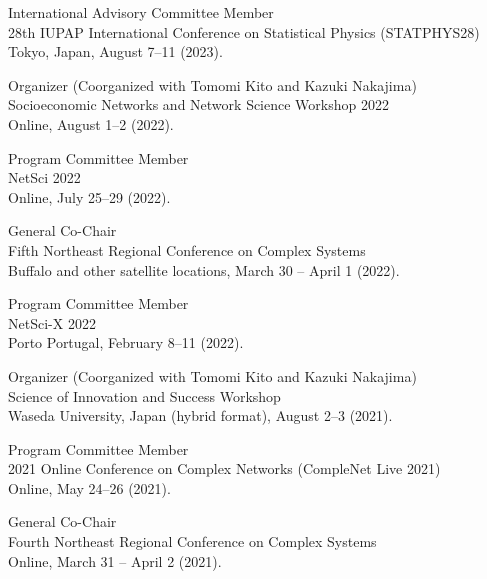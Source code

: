 \documentclass[11pt,letter]{article}
\renewenvironment{itemize}{
  \begin{list}{}{
    \setlength{\leftmargin}{1.5em}
    \setlength{\itemsep}{0.25em}
    \setlength{\parskip}{0pt}
    \setlength{\parsep}{0.25em}
  }
}{
  \end{list}
}
\begin{document}
\begin{itemize}
\item International Advisory Committee Member\\
28th IUPAP International Conference on Statistical Physics (STATPHYS28)\\
Tokyo, Japan, August 7--11 (2023).

\item Organizer (Coorganized with Tomomi Kito and Kazuki Nakajima)\\
Socioeconomic Networks and Network Science Workshop 2022\\
Online, August 1--2 (2022).

\item Program Committee Member\\
NetSci 2022\\
Online, July 25--29 (2022).

\item General Co-Chair\\
Fifth Northeast Regional Conference on Complex Systems\\
Buffalo and other satellite locations, March 30 -- April 1 (2022).

\item Program Committee Member\\
NetSci-X 2022\\
Porto Portugal, February 8--11 (2022).

\item Organizer (Coorganized with Tomomi Kito and Kazuki Nakajima)\\
Science of Innovation and Success Workshop\\
Waseda University, Japan (hybrid format), August 2--3 (2021).


\item Program Committee Member\\
2021 Online Conference on Complex Networks (CompleNet Live 2021)\\
Online, May 24--26 (2021).

\item General Co-Chair\\
Fourth Northeast Regional Conference on Complex Systems\\
Online, March 31 -- April 2 (2021).


\end{itemize}
\end{document}
